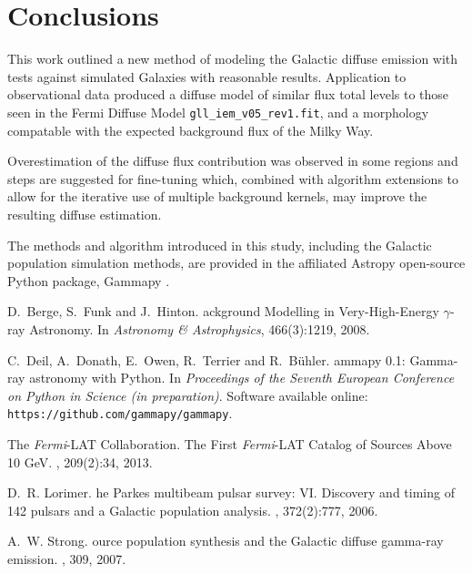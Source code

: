 \documentclass{PoS}
\begin{document}
\section{Conclusions}

This work outlined a new method of modeling the Galactic diffuse emission with tests against simulated Galaxies with reasonable results. Application to observational data produced a diffuse model of similar flux total levels to those seen in the Fermi Diffuse Model \verb|gll_iem_v05_rev1.fit|, and a morphology compatable with the expected background flux of the Milky Way.

Overestimation of the diffuse flux contribution was observed in some regions and steps are suggested for fine-tuning which, combined with algorithm extensions to allow for the iterative use of multiple background kernels, may improve the resulting diffuse estimation.

The methods and algorithm introduced in this study, including the Galactic population simulation methods, are provided in the affiliated Astropy open-source Python package, Gammapy \cite{Deil}.

\begin{thebibliography}{99}

D.~Berge, S.~Funk and J.~Hinton.
ackground {M}odelling in {V}ery-{H}igh-{E}nergy $\gamma$-ray {A}stronomy.
\newblock In {\em {A}stronomy \& {A}strophysics}, 466(3):1219, 2008.

C.~Deil, A.~Donath, E.~Owen, R.~Terrier and R.~B{\"{u}}hler.
ammapy {0.1}: {G}amma-ray astronomy with {P}ython.
\newblock In {\em {P}roceedings of the {S}eventh {E}uropean {C}onference on
  {P}ython in {S}cience (in preparation)}.
\newblock Software available online: {\verb|https://github.com/gammapy/gammapy|}.

{The \textit{Fermi}-LAT Collaboration}.
\newblock The {F}irst {\textit{Fermi}-LAT} {C}atalog of {S}ources {A}bove 10 {GeV}.
, 209(2):34, 2013.

D.~R. Lorimer.
he {P}arkes multibeam pulsar survey: {VI.} {D}iscovery and timing
  of 142 pulsars and a {G}alactic population analysis.
, 372(2):777,
  2006.

A.~W. Strong.
ource population synthesis and the {G}alactic diffuse gamma-ray
  emission.
, 309, 2007.


\end{thebibliography}
\end{document}

